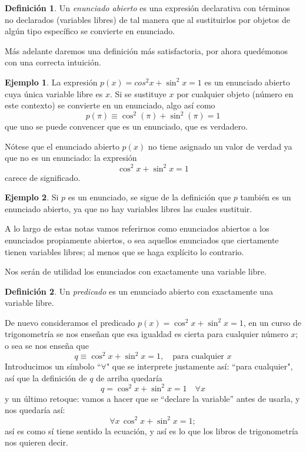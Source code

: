 \documentclass{book}
\theoremstyle{definition}
\newtheorem{df}{Definición}[chapter]
\newtheorem{ejm}{Ejemplo}[chapter]
\begin{document}
\begin{df}
	Un \emph{enunciado abierto} es una expresión declarativa con términos no declarados (variables libres) de tal manera que al sustituirlos por objetos de algún tipo específico se convierte en enunciado.
\end{df}
Más adelante daremos una definición más satisfactoria, por ahora quedémonos con una correcta intuición.
\begin{ejm}
	La expresión $p(x) = cos^2 x + \sin^2 x = 1$ es un enunciado abierto cuya única variable libre es $x$.
	Si se sustituye $x$ por cualquier objeto (número en este contexto) se convierte en un enunciado, algo así como \[p(\pi) \equiv \cos^2(\pi) + \sin^2(\pi) = 1\]
	que uno se puede convencer que es un enunciado, que es verdadero.
	
	Nótese que el enunciado abierto $p(x)$ no tiene asignado un valor de verdad ya que no es un enunciado: la expresión \[\cos^2 x + \sin^2 x = 1\]
	carece de significado.
\end{ejm}

\begin{ejm}
	Si $p$ es un enunciado, se sigue de la definición que $p$ también es un enunciado abierto, ya que no hay variables libres las cuales sustituir.
	
	A lo largo de estas notas vamos referirnos como enunciados abiertos a los enunciados propiamente abiertos, o sea aquellos enunciados que ciertamente tienen variables libres; al menos que se haga explícito lo contrario.
\end{ejm}

Nos serán de utilidad los enunciados con exactamente una variable libre.
\begin{df}
	Un \emph{predicado} es un enunciado abierto con exactamente una variable libre. 
\end{df}
De nuevo consideramos el predicado $p(x) = \cos^2 x + \sin^2 x = 1$, en un curso de trigonometría se nos enseñan que esa igualdad es cierta para cualquier número $x$; o sea se nos enseña que
\[q \equiv \cos^2 x + \sin^2 x = 1,\quad \text{para cualquier } x \]
Introducimos un símbolo ``$\forall$" que se interprete justamente así: ``para cualquier", así que la definición de $q$ de arriba quedaría
\[q = \cos^2 x + \sin^2 x = 1\quad \forall x\]
y un último retoque: vamos a hacer que se ``declare la variable'' antes de usarla, y nos quedaría así:
\begin{equation}
	\forall x\, \cos^2 x + \sin^2 x = 1;
\end{equation}
así es como sí tiene sentido la ecuación, y así es lo que los libros de trigonometría nos quieren decir.
\end{document}
